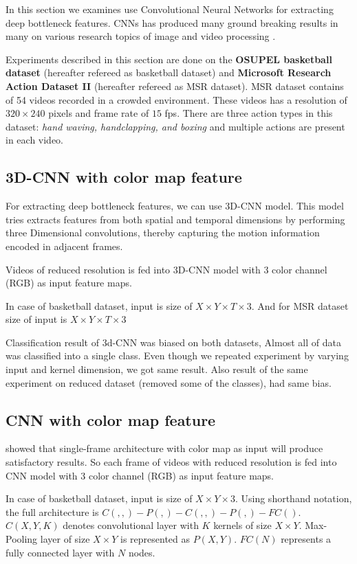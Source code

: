 In this section we examines use Convolutional Neural Networks for extracting deep bottleneck features. CNNs has produced many ground breaking results in many on various research topics of image and video processing \citep{KarpathyCVPR14, ji20133d, krizhevsky2012imagenet}. 

Experiments described in this section are done on the \textbf{OSUPEL basketball dataset} \cite{brendel2011probabilistic} (hereafter refereed as basketball dataset) and \textbf{Microsoft Research Action Dataset \RN{2}} (hereafter refereed as MSR dataset). MSR dataset contains of 54 videos recorded in a crowded environment. These videos has  a resolution of $320\times240$ pixels and frame rate of $15$ fps. There are three action types in this dataset: \textit{hand waving, handclapping, and boxing } and multiple actions are present in each video.

\subsection{3D-CNN with color map feature}
For extracting deep bottleneck features, we can use 3D-CNN model. This model tries extracts features from both spatial and temporal dimensions by performing three Dimensional convolutions, thereby capturing the motion information encoded in adjacent frames\citep{ji20133d}.

Videos of reduced resolution is fed into 3D-CNN model with 3 color channel (RGB) as input feature maps. 

In case of basketball dataset, input is size of $X \times Y \times T \times 3$. And for MSR dataset size of input is $X \times Y \times T \times 3$

Classification result of 3d-CNN was biased on both datasets, Almost all of data was classified into a single class. Even though we repeated experiment by varying input and kernel dimension, we got same result. Also result of the same experiment on reduced dataset (removed some of the classes), had same bias. 

\subsection{CNN with color map feature}
\citet{KarpathyCVPR14} showed that single-frame architecture with color map as input will produce satisfactory results. So each frame of videos with reduced resolution is fed into CNN model with 3 color channel (RGB) as input feature maps.

In case of basketball dataset, input is size of $X \times Y \times 3$. Using shorthand notation, the full architecture is $C(, , )-P(, )-C(, , )-P(, )-FC()$. $C(X, Y, K)$ denotes convolutional layer with $K$ kernels of size $X \times Y$. Max-Pooling layer of size $X \times Y$ is represented as $P(X,Y)$. $FC(N)$ represents a fully connected layer with $N$ nodes. 

